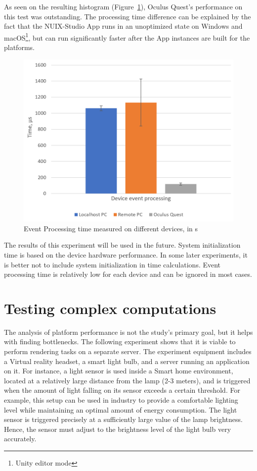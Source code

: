 As seen on the resulting histogram (Figure~\ref{fig:EventProcessingTime-figure}), Oculus Quest's performance on this test was outstanding. The processing time difference can be explained by the fact that the NUIX-Studio App runs in an unoptimized state on Windows and macOS\footnote{Unity editor mode}, but can run significantly faster after the App instances are built for the platforms.

\begin{figure}
  \centering
  \includegraphics[width = 0.9 \linewidth]{figures/EventProcessingTime.png}
  \caption{Event Processing time measured on different devices, in \textmu{}s}
  \label{fig:EventProcessingTime-figure}
\end{figure}

The results of this experiment will be used in the future. System initialization time is based on the device hardware performance. In some later experiments, it is better not to include system initialization in time calculations. Event processing time is relatively low for each device and can be ignored in most cases.

\section{Testing complex computations}

The analysis of platform performance is not the study's primary goal, but it helps with finding bottlenecks. The following experiment shows that it is viable to perform rendering tasks on a separate server. The experiment equipment includes a Virtual reality headset, a smart light bulb, and a server running an application on it. For instance, a light sensor is used inside a Smart home environment, located at a relatively large distance from the lamp (2-3 meters), and is triggered when the amount of light falling on its sensor exceeds a certain threshold. For example, this setup can be used in industry to provide a comfortable lighting level while maintaining an optimal amount of energy consumption. The light sensor is triggered precisely at a sufficiently large value of the lamp brightness. Hence, the sensor must adjust to the brightness level of the light bulb very accurately.

